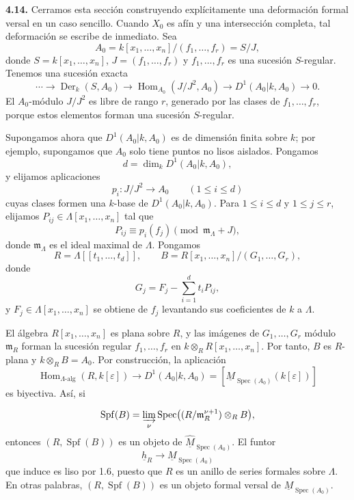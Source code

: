 \par\medskip
\noindent\textbf{4.14.}
Cerramos esta sección construyendo explícitamente una deformación
formal versal en un caso sencillo. Cuando $X_0$ es afín y una
intersección completa, tal deformación se escribe de inmediato. Sea
\[
A_0=k[x_1,\ldots,x_n]/(f_1,\ldots,f_r)=S/J,
\]
donde $S=k[x_1,\ldots,x_n]$, $J=(f_1,\ldots,f_r)$ y
$f_1,\ldots,f_r$ es una sucesión $S$-regular. Tenemos una sucesión
exacta
\[
\cdots\longrightarrow\operatorname{Der}_k(S,A_0)
\longrightarrow\operatorname{Hom}_{A_0}(J/J^2,A_0)
\longrightarrow D^1(A_0|k,A_0)\longrightarrow0.
\]
El $A_0$-módulo $J/J^2$ es libre de rango $r$, generado por las
clases de $f_1,\ldots,f_r$, porque estos elementos forman una
sucesión $S$-regular.

Supongamos ahora que $D^1(A_0|k,A_0)$ es de dimensión finita sobre
$k$; por ejemplo, supongamos que $A_0$ solo tiene puntos no lisos
aislados. Pongamos
\[
d=\dim_kD^1(A_0|k,A_0),
\]
y elijamos aplicaciones
\[
p_i:J/J^2\longrightarrow A_0\qquad(1\leq i\leq d)
\]
cuyas clases formen una $k$-base de $D^1(A_0|k,A_0)$. Para
$1\leq i\leq d$ y $1\leq j\leq r$, elijamos
$P_{ij}\in\Lambda[x_1,\ldots,x_n]$ tal que
\[
P_{ij}\equiv p_i(f_j)\pmod{\mathfrak m_\Lambda+J},
\]
donde $\mathfrak m_\Lambda$ es el ideal maximal de $\Lambda$. Pongamos
\[
R=\Lambda[[t_1,\ldots,t_d]],
\qquad
B=R[x_1,\ldots,x_n]/(G_1,\ldots,G_r),
\]
donde
\[
G_j=F_j-\sum_{i=1}^d t_iP_{ij},
\]
y $F_j\in\Lambda[x_1,\ldots,x_n]$ se obtiene de $f_j$ levantando sus
coeficientes de $k$ a $\Lambda$.

El álgebra $R[x_1,\ldots,x_n]$ es plana sobre $R$, y las imágenes de
$G_1,\ldots,G_r$ módulo $\mathfrak m_R$ forman la sucesión regular
$f_1,\ldots,f_r$ en
$k\otimes_RR[x_1,\ldots,x_n]$. Por tanto, $B$ es $R$-plana y
$k\otimes_RB=A_0$. Por construcción, la aplicación
\[
\operatorname{Hom}_{\Lambda\text{-alg}}(R,k[\varepsilon])
\longrightarrow D^1(A_0|k,A_0)
=[\underline M_{\operatorname{Spec}(A_0)}(k[\varepsilon])]
\]
es biyectiva. Así, si


\[
\operatorname{Spf}(B)
=\varinjlim_\nu
\operatorname{Spec}\bigl((R/\mathfrak m_R^{\nu+1})\otimes_RB\bigr),
\]
entonces $(R,\operatorname{Spf}(B))$ es un objeto de
$\widehat{\underline M}_{\operatorname{Spec}(A_0)}$. El funtor
\[
\underline h_R\longrightarrow\underline M_{\operatorname{Spec}(A_0)}
\]
que induce es liso por 1.6, puesto que $R$ es un anillo de series
formales sobre $\Lambda$. En otras palabras,
$(R,\operatorname{Spf}(B))$ es un objeto formal versal de
$\underline M_{\operatorname{Spec}(A_0)}$.

